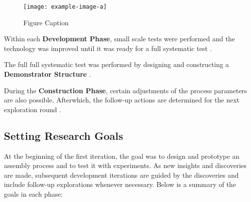 \begin{figure}
    \centering
    \texttt{[image: example-image-a]}
    \caption{Figure Caption}
\end{figure}

Within each \textbf{Development Phase}, small scale tests were performed and the technology was improved until it was ready for a full systematic test . 

The full full systematic test was performed by designing and constructing a \textbf{Demonstrator Structure} . 

During the \textbf{Construction Phase}, certain adjustments of the process parameters are also possible. Afterwhich, the follow-up actions are determined for the next exploration round .

\subsection{Setting Research Goals}
\label{subsection:methodology-setting-research-goals}

At the beginning of the first iteration, the goal was to design and prototype an assembly process and to test it with experiments. As new insights and discoveries are made, subsequent development iterations are guided by the discoveries and include follow-up explorations whenever necessary. Below is a summary of the goals in each phase:

